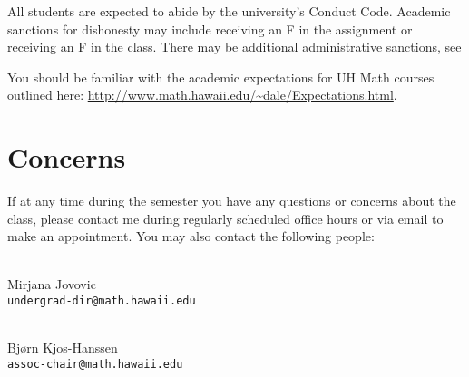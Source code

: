 \documentclass[12pt]{amsart}
\newcommand{\spacer}{\vspace{.2cm}}
\newcommand{\svs}{\vspace{.1cm}}
\begin{document}
All students are expected to abide by the university's Conduct Code. Academic sanctions for dishonesty may include receiving an F in the assignment or receiving an F in the class. There may be additional administrative sanctions, see
\svs

 You should be familiar with the  academic expectations for UH Math courses outlined here: 
\newline \url{http://www.math.hawaii.edu/~dale/Expectations.html}.

\section*{Concerns}
If at any time during the semester you have any questions or concerns about the class, please contact me during regularly scheduled office hours or via email to make an appointment. You may also contact the following people:
\spacer

\begin{multicols}{2}
\\
Mirjana Jovovic \\
\texttt{undergrad-dir@math.hawaii.edu}

\begin{flushright}
\\
Bj{\o}rn Kjos-Hanssen \\
\texttt{assoc-chair@math.hawaii.edu}
\end{flushright}
\end{multicols}
\end{document}

